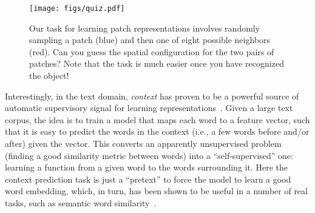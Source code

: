 \documentclass[10pt,twocolumn,letterpaper]{article}
\newcommand{\todo}[1]{\textcolor{red}{TODO: #1}\PackageWarning{TODO:}{#1!}}
\begin{document}
\begin{figure}[t]
\begin{center}

   \texttt{[image: figs/quiz.pdf]}
   \vspace{-.2cm}
\end{center}
   \caption{Our task for learning patch representations involves randomly sampling a patch (blue) and then one of eight possible neighbors (red).  Can you guess the spatial configuration for the two pairs of patches?  Note that the task is much easier once you have recognized the object! 
}
\hfill\protect{}
\vspace{-.2in}
\label{fig:quiz}
\end{figure}



Interestingly, in the text domain, \textit{context} has proven to be a powerful source of automatic supervisory signal for learning representations~\cite{ando2005framework,tsujiiythu2007discriminative,collobert2008unified,mikolov2013distributed}. 
Given a large text corpus, the idea is to train a model that maps each word to a feature vector, such that it is easy to predict the words in the context (i.e., a few words before and/or after) given the vector.  This converts an apparently unsupervised problem (finding a good similarity metric between words) into a 
``self-supervised'' one: learning a function from a given word to the words surrounding it. Here the context prediction task is just a ``pretext'' to force the model to learn a good word embedding, which, in turn, has been shown to be useful in a number of real tasks, such as semantic word similarity~\cite{mikolov2013distributed}. 
\end{document}
